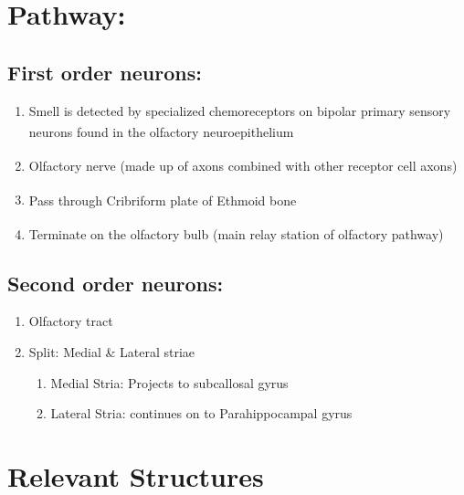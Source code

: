 \documentclass[
  letterpaper,
  DIV=11,
  numbers=noendperiod]{scrartcl}
\providecommand{\tightlist}{%
  \setlength{\itemsep}{0pt}\setlength{\parskip}{0pt}}\usepackage{longtable,booktabs,array}
\begin{document}
\section{Pathway:}\label{pathway}

\subsection{First order neurons:}\label{first-order-neurons}

\begin{enumerate}
\def\labelenumi{\arabic{enumi}.}
\tightlist
\item
  Smell is detected by specialized chemoreceptors on bipolar primary
  sensory neurons found in the olfactory
  neuroepithelium\textsuperscript{}
\item
  Olfactory nerve (made up of axons combined with other receptor cell
  axons)\textsuperscript{}
\item
  Pass through Cribriform plate of Ethmoid
  bone\textsuperscript{}
\item
  Terminate on the olfactory bulb (main relay station of olfactory
  pathway)\textsuperscript{}
\end{enumerate}

\subsection{Second order neurons:}\label{second-order-neurons}

\begin{enumerate}
\def\labelenumi{\arabic{enumi}.}
\tightlist
\item
  Olfactory tract
\item
  Split: Medial \& Lateral striae

  \begin{enumerate}
  \def\labelenumii{\arabic{enumii}.}
  \tightlist
  \item
    Medial Stria: Projects to subcallosal gyrus
  \item
    Lateral Stria: continues on to Parahippocampal gyrus
  \end{enumerate}
\end{enumerate}

\section{Relevant Structures}\label{relevant-structures}
\end{document}
